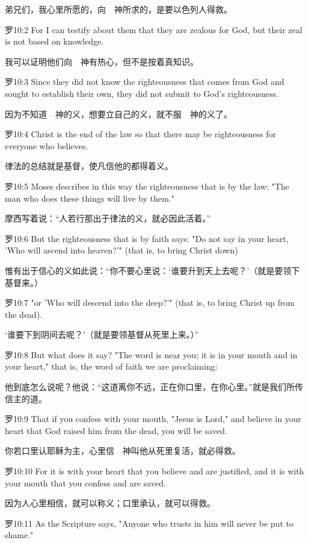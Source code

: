 \documentclass[a4paper,11pt,onecolumn,twoside]{ctexart}
\begin{document}
\begin{multicols}{2}
 弟兄们，我心里所愿的，向　神所求的，是要以色列人得救。


 罗10:2
 For I can testify about them that they are zealous for God, but their zeal is not based on knowledge.

 我可以证明他们向　神有热心，但不是按着真知识。


 罗10:3
 Since they did not know the righteousness that comes from God and sought to establish their own, they did not submit to God's righteousness.

 因为不知道　神的义，想要立自己的义，就不服　神的义了。


 罗10:4
 Christ is the end of the law so that there may be righteousness for everyone who believes.

 律法的总结就是基督，使凡信他的都得着义。


 罗10:5
 Moses describes in this way the righteousness that is by the law: "The man who does these things will live by them."

 摩西写着说：“人若行那出于律法的义，就必因此活着。”


 罗10:6
 But the righteousness that is by faith says: "Do not say in your heart, 'Who will ascend into heaven?'" (that is, to bring Christ down)

 惟有出于信心的义如此说：“你不要心里说：‘谁要升到天上去呢？’（就是要领下基督来。）


 罗10:7
 "or 'Who will descend into the deep?'" (that is, to bring Christ up from the dead).

 ‘谁要下到阴间去呢？’（就是要领基督从死里上来。）”


 罗10:8
 But what does it say? "The word is near you; it is in your mouth and in your heart," that is, the word of faith we are proclaiming:

 他到底怎么说呢？他说：“这道离你不远，正在你口里，在你心里。”就是我们所传信主的道。


 罗10:9
 That if you confess with your mouth, "Jesus is Lord," and believe in your heart that God raised him from the dead, you will be saved.

 你若口里认耶稣为主，心里信　神叫他从死里复活，就必得救。


 罗10:10
 For it is with your heart that you believe and are justified, and it is with your mouth that you confess and are saved.

 因为人心里相信，就可以称义；口里承认，就可以得救。


 罗10:11
 As the Scripture says, "Anyone who trusts in him will never be put to shame."


\end{multicols}
\end{document}
